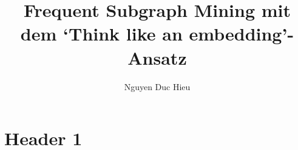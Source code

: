 \documentclass[12pt,a4paper]{article}
\author{Nguyen Duc Hieu}
\title{\textbf{Frequent Subgraph Mining mit dem `Think like an embedding'-Ansatz}}
\begin{document}
\maketitle
\section*{Header 1}
\end{document}
